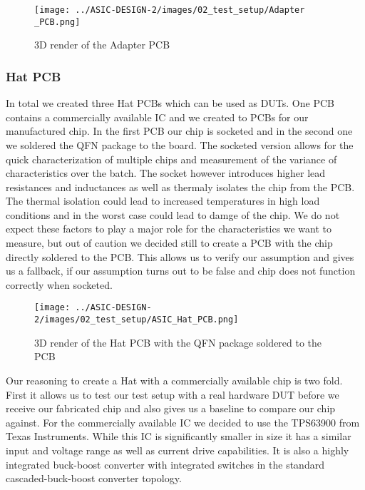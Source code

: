 \begin{figure}[h]
    \centering
    \texttt{[image: ../ASIC-DESIGN-2/images/02\_test\_setup/Adapter \_PCB.png]}
    \caption{3D render of the Adapter PCB}
    \label{fig:Adapter_PCB}
\end{figure}



\subsubsection{Hat PCB}
In total we created three Hat PCBs which can be used as \ac{DUT}s. One PCB contains a commercially available IC and we created to PCBs for our manufactured chip. In the first PCB our chip is socketed and in the second one we soldered the QFN package to the board. The socketed version allows for the quick characterization of multiple chips and measurement of the variance of characteristics over the batch. The socket however introduces higher lead resistances and inductances as well as thermaly isolates the chip from the PCB. The thermal isolation could lead to increased temperatures in high load conditions and in the worst case could lead to damge of the chip. We do not expect these factors to play a major role for the characteristics we want to measure, but out of caution we decided still to create a PCB with the chip directly soldered to the PCB. This allows us to verify our assumption and gives us a fallback, if our assumption turns out to be false and chip does not function correctly when socketed. \\

\begin{figure}[h]
    \centering
    \texttt{[image: ../ASIC-DESIGN-2/images/02\_test\_setup/ASIC\_Hat\_PCB.png]}
    \caption{3D render of the Hat PCB with the QFN package soldered to the PCB}
    \label{fig:ASIC_Hat}
\end{figure}


Our reasoning to create a Hat with a commercially available chip is two fold. First it allows us to test our test setup with a real hardware \ac{DUT} before we receive our fabricated chip and also gives us a baseline to compare our chip against. For the commercially available IC we decided to use the TPS63900 from Texas Instruments. While this IC is significantly smaller in size it has a similar input and voltage range as well as current drive capabilities. It is also a highly integrated buck-boost converter with integrated switches in the standard cascaded-buck-boost converter topology. 

